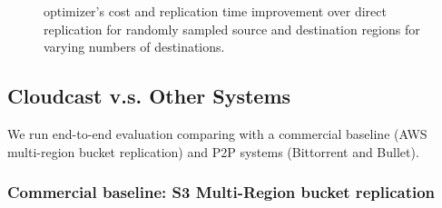 \begin{figure}[t]
\centering
{} 
\caption{\sys{} optimizer's cost and replication time improvement over direct replication for randomly sampled source and destination regions for varying numbers of destinations.} \label{fig:dest_ablation}
\end{figure}



\subsection{Cloudcast v.s. Other Systems} \label{sec:sys_eval}
We run end-to-end evaluation comparing \sys{} with a commercial baseline (AWS multi-region bucket replication) and P2P systems (Bittorrent and Bullet). 

\subsubsection{Commercial baseline: S3 Multi-Region bucket replication}

